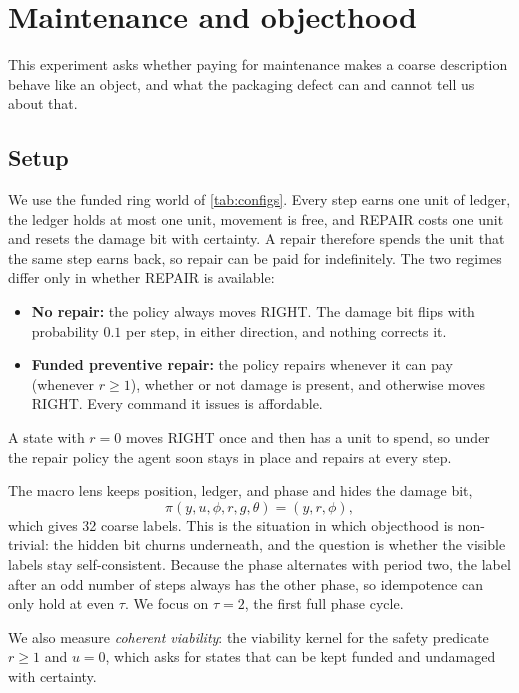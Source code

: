 \section{Maintenance and objecthood}
\label{sec:ex_packaging}

This experiment asks whether paying for maintenance makes a coarse description behave like an object, and what the packaging defect can and cannot tell us about that.

\subsection{Setup}
We use the funded ring world of \cref{tab:configs}. Every step earns one unit of ledger, the ledger holds at most one unit, movement is free, and REPAIR costs one unit and resets the damage bit with certainty. A repair therefore spends the unit that the same step earns back, so repair can be paid for indefinitely. The two regimes differ only in whether REPAIR is available:
\begin{itemize}[leftmargin=*, itemsep=0.25em]
  \item \textbf{No repair:} the policy always moves RIGHT. The damage bit flips with probability $0.1$ per step, in either direction, and nothing corrects it.
  \item \textbf{Funded preventive repair:} the policy repairs whenever it can pay (whenever $r\ge 1$), whether or not damage is present, and otherwise moves RIGHT. Every command it issues is affordable.
\end{itemize}
A state with $r=0$ moves RIGHT once and then has a unit to spend, so under the repair policy the agent soon stays in place and repairs at every step.

The macro lens keeps position, ledger, and phase and hides the damage bit,
\[
\pi(y,u,\phi,r,g,\theta) = (y,r,\phi),
\]
which gives 32 coarse labels. This is the situation in which objecthood is non-trivial: the hidden bit churns underneath, and the question is whether the visible labels stay self-consistent. Because the phase alternates with period two, the label after an odd number of steps always has the other phase, so idempotence can only hold at even $\tau$. We focus on $\tau=2$, the first full phase cycle.

We also measure \emph{coherent viability}: the viability kernel for the safety predicate $r\ge1$ and $u=0$, which asks for states that can be kept funded and undamaged with certainty.

